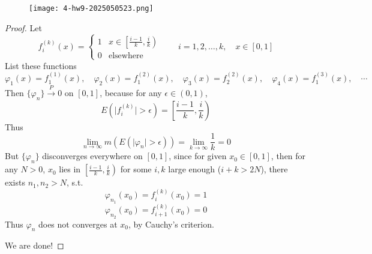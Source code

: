 \begin{exercise}
\begin{figure}[H]
\centering
\texttt{[image: 4-hw9-2025050523.png]}
\label{}
\end{figure}
\end{exercise}
\begin{proof}
Let
\[
f^{(k)}_i(x)=\begin{cases}
1 & x\in\left[ \frac{i-1}{k},\frac{i}{k} \right.\left.\right) \\
0 & \text{elsewhere}
\end{cases}\qquad i=1,2,\dots,k,\quad x\in[0,1]
\]
List these functions
\[
\varphi_1(x)=f_1^{(1)}(x), \quad \varphi_2(x)=f_1^{(2)}(x), \quad \varphi_3(x)=f_2^{(2)}(x), \quad \varphi_4(x)=f_1^{(3)}(x), \quad \cdots
\]
Then $\{ \varphi_n \}\overset{ P }{ \to }0$ on $[0,1]$, because for any $\epsilon\in(0,1)$,
\[
E(\lvert f^{(k)}_{i} \rvert >\epsilon)=\left[ \left.\frac{i-1}{k},\frac{i}{k} \right.\right)
\]
Thus
\[
\lim_{ n \to \infty } m(E(\lvert \varphi _n \rvert >\epsilon ))=\lim_{ k \to \infty } \frac{1}{k}=0
\]
But $\{ \varphi _n \}$ disconverges everywhere on $[0,1]$, since for given $x_0\in[0,1]$, then for any $N>0$, $x_0$ lies in $\left[ \left.\frac{i-1}{k},\frac{i}{k} \right.\right)$ for some $i,k$ large enough ($i+k>2N$), there exists $n_1,n_2>N$, s.t.
\[
\varphi_{n_1}(x_0)=f^{(k)}_i(x_0)=1
\]
\[
\varphi_{n_2}(x_0)=f^{(k)}_{i+1}(x_0)=0
\]
Thus $\varphi _n$ does not converges at $x_0$, by Cauchy's criterion.

We are done!
\end{proof}

